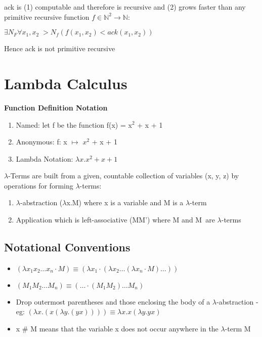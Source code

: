 \documentclass{article}
\newenvironment{definition}{\par\color{blue}}{\par}
\begin{document}
\noindent
ack is (1) computable and therefore is recursive and (2) grows faster than any primitive recursive function $f \in \mathbb{N}^{2} \rightarrow \mathbb{N}$:

$\exists N_{F} \forall x_{1}, x_{2} \; > N_{f} (f(x_{1}, x_{2}) < ack(x_{1}, x_{2}))$

\noindent Hence ack is not primitive recursive

\section{Lambda Calculus}
\textbf{Function Definition Notation}
\begin{enumerate}
    \item Named: let f be the function f(x) = x$^{2}$ + x + 1
    \item Anonymous: f: x $\mapsto$ $x^{2}$ + x + 1
    \item Lambda Notation: $\lambda x . x^{2} + x + 1$
\end{enumerate}


\begin{definition}
\noindent
$\lambda$-Terms are built from a given, countable collection of variables (x, y, z) by operations for forming $\lambda$-terms:
\begin{enumerate}
    \item $\lambda$-abstraction ($\lambda$x.M) where x is a variable and M is a $\lambda$-term
    \item Application which is left-associative (MM') where M and M\ are $\lambda$-terms
\end{enumerate}
\end{definition}

\subsection{Notational Conventions}
\begin{itemize}
    \item $\left(\lambda x_{1} x_{2} \ldots x_{n} \cdot M\right) \equiv \left(\lambda x_{1} \cdot\left(\lambda x_{2} \ldots\left(\lambda x_{n} \cdot M\right) \ldots\right)\right)$
    
    \item $\left(M_{1} M_{2} \dots M_{n}\right) \equiv \left(\ldots \cdot\left(M_{1} M_{2}\right) \ldots M_{n}\right)$
    
    \item Drop outermost parentheses and those enclosing the body of a $\lambda$-abstraction - eg: $(\lambda x .(x(\lambda y .(y x)))) \equiv \lambda x . x(\lambda y . y x)$
    
    \item x $\#$ M means that the variable x does not occur anywhere in the $\lambda$-term M
\end{itemize}
\end{document}
